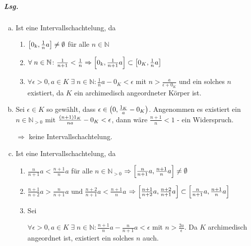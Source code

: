 \documentclass{scrreprt}
\begin{document}
\subparagraph{Lsg.}
\begin{enumerate}[(a)]
\item Ist eine Intervallschachtelung, da
  \begin{enumerate}[(1)]
  \item $\qty[0_k, \frac{1}{n}a] \ne \emptyset$ für alle $n \in \mathbb{N}$
  \item $\forall \; n \in \mathbb{N} \colon
    \frac{1}{n + 1} < \frac{1}{n}
    \Rightarrow \qty[0_k, \frac{1}{n + 1}a] \subset \qty[0_K, \frac{1}{n}a]$

  \item $\forall \epsilon > 0, a \in K \; \exists \; n \in \mathbb{N}
    \colon \frac{1}{n}a - 0_K< \epsilon$ mit $n > \frac{a}{\epsilon + 0_K}$
    und ein solches $n$ existiert, da $K$ ein archimedisch angeordneter Körper
    ist.
  \end{enumerate}

\newpage
\item Sei $\epsilon \in K$ so gewählt, dass
  $\epsilon \in \qty(0, \frac{1_K}{a} - 0_K)$.
  Angenommen es existiert ein $n \in \mathbb{N}_{> 0}$ mit
  $\frac{\qty(n + 1)1_K}{na} - 0_K < \epsilon$, dann wäre
  $\frac{n + 1}{n} < 1$ - ein Widerspruch.

  $\Rightarrow$ keine Intervallschachtelung.

\item Ist eine Intervallschachtelung, da
  \begin{enumerate}[(1)]
  \item $\frac{n}{n + 1}a < \frac{n + 1}{n}a$ für alle $n \in \mathbb{N}_{> 0}$
    $\Rightarrow \qty[\frac{n}{n + 1}a, \frac{n + 1}{n} a] \ne \emptyset$

  \item $\frac{n + 1}{n + 2}a > \frac{n}{n + 1}a$ und
    $\frac{n + 2}{n + 1}a < \frac{n + 1}{n}a$
    $\Rightarrow \qty[\frac{n + 1}{n + 2}a, \frac{n + 2}{n + 1} a]
    \subset \qty[\frac{n}{n + 1}a, \frac{n + 1}{n} a]$

  \item Sei

    $\forall \epsilon > 0, a \in K \; \exists \; n \in \mathbb{N}
    \colon \frac{n + 1}{n}a - \frac{n}{n + 1}a < \epsilon$ mit
    $n > \frac{2a}{\epsilon}$.
    Da $K$ archimedisch angeordnet ist, existiert ein solches $n$ auch.
  \end{enumerate}
\end{enumerate}
\end{document}
